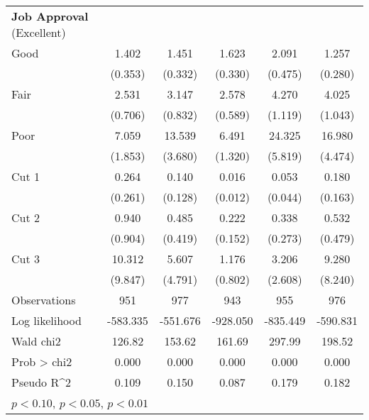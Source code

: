 \begin{table}[htbp]
\begin{tabular}{l*{5}{c}}
\textbf{Job Approval} (Excellent) &  &  &  &   & \\
Good                &       1.402         &       1.451         &       1.623\sym{**} &       2.091\sym{***}&       1.257         \\
                    &     (0.353)         &     (0.332)         &     (0.330)         &     (0.475)         &     (0.280)         \\
Fair                &       2.531\sym{***}&       3.147\sym{***}&       2.578\sym{***}&       4.270\sym{***}&       4.025\sym{***}\\
                    &     (0.706)         &     (0.832)         &     (0.589)         &     (1.119)         &     (1.043)         \\
Poor                &       7.059\sym{***}&      13.539\sym{***}&       6.491\sym{***}&      24.325\sym{***}&      16.980\sym{***}\\
                    &     (1.853)         &     (3.680)         &     (1.320)         &     (5.819)         &     (4.474)         \\
Cut 1               &       0.264         &       0.140\sym{**} &       0.016\sym{***}&       0.053\sym{***}&       0.180\sym{*}  \\
                    &     (0.261)         &     (0.128)         &     (0.012)         &     (0.044)         &     (0.163)         \\
Cut 2               &       0.940         &       0.485         &       0.222\sym{**} &       0.338         &       0.532         \\
                    &     (0.904)         &     (0.419)         &     (0.152)         &     (0.273)         &     (0.479)         \\
Cut 3               &      10.312\sym{**} &       5.607\sym{**} &       1.176         &       3.206         &       9.280\sym{**} \\
                    &     (9.847)         &     (4.791)         &     (0.802)         &     (2.608)         &     (8.240)         \\
\hline
Observations        &         951         &         977         &         943         &         955         &         976         \\
Log likelihood      &    -583.335         &    -551.676         &    -928.050         &    -835.449         &    -590.831         \\
Wald chi2           &      126.82         &      153.62         &      161.69         &      297.99         &      198.52         \\
Prob > chi2         &       0.000         &       0.000         &       0.000         &       0.000         &       0.000         \\
Pseudo R^2          &       0.109         &       0.150         &       0.087         &       0.179         &       0.182         \\
\hline\hline
\multicolumn{7}{l}{\footnotesize \sym{*} \(p<0.10\), \sym{**} \(p<0.05\), \sym{***} \(p<0.01\)}\\


\end{tabular}
\end{table}